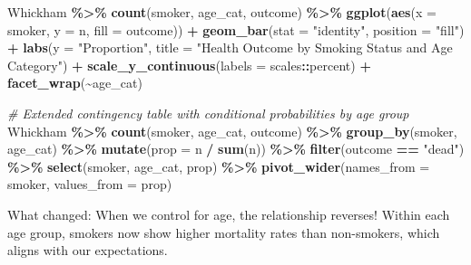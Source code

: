 \documentclass[
]{article}
\newenvironment{Shaded}{\begin{snugshade}}{\end{snugshade}}
\newcommand{\AttributeTok}[1]{\textcolor[rgb]{0.13,0.29,0.53}{#1}}
\newcommand{\CommentTok}[1]{\textcolor[rgb]{0.56,0.35,0.01}{\textit{#1}}}
\newcommand{\FunctionTok}[1]{\textcolor[rgb]{0.13,0.29,0.53}{\textbf{#1}}}
\newcommand{\NormalTok}[1]{#1}
\newcommand{\SpecialCharTok}[1]{\textcolor[rgb]{0.81,0.36,0.00}{\textbf{#1}}}
\newcommand{\StringTok}[1]{\textcolor[rgb]{0.31,0.60,0.02}{#1}}
\begin{document}
\begin{Shaded}
\begin{Highlighting}[]
\NormalTok{Whickham }\SpecialCharTok{\%\textgreater{}\%}
  \FunctionTok{count}\NormalTok{(smoker, age\_cat, outcome) }\SpecialCharTok{\%\textgreater{}\%}
  \FunctionTok{ggplot}\NormalTok{(}\FunctionTok{aes}\NormalTok{(}\AttributeTok{x =}\NormalTok{ smoker, }\AttributeTok{y =}\NormalTok{ n, }\AttributeTok{fill =}\NormalTok{ outcome)) }\SpecialCharTok{+}
  \FunctionTok{geom\_bar}\NormalTok{(}\AttributeTok{stat =} \StringTok{"identity"}\NormalTok{, }\AttributeTok{position =} \StringTok{"fill"}\NormalTok{) }\SpecialCharTok{+}
  \FunctionTok{labs}\NormalTok{(}\AttributeTok{y =} \StringTok{"Proportion"}\NormalTok{, }\AttributeTok{title =} \StringTok{"Health Outcome by Smoking Status and Age Category"}\NormalTok{) }\SpecialCharTok{+}
  \FunctionTok{scale\_y\_continuous}\NormalTok{(}\AttributeTok{labels =}\NormalTok{ scales}\SpecialCharTok{::}\NormalTok{percent) }\SpecialCharTok{+}
  \FunctionTok{facet\_wrap}\NormalTok{(}\SpecialCharTok{\textasciitilde{}}\NormalTok{age\_cat)}
\end{Highlighting}
\end{Shaded}

\begin{Shaded}
\begin{Highlighting}[]
\CommentTok{\# Extended contingency table with conditional probabilities by age group}
\NormalTok{Whickham }\SpecialCharTok{\%\textgreater{}\%}
  \FunctionTok{count}\NormalTok{(smoker, age\_cat, outcome) }\SpecialCharTok{\%\textgreater{}\%}
  \FunctionTok{group\_by}\NormalTok{(smoker, age\_cat) }\SpecialCharTok{\%\textgreater{}\%}
  \FunctionTok{mutate}\NormalTok{(}\AttributeTok{prop =}\NormalTok{ n }\SpecialCharTok{/} \FunctionTok{sum}\NormalTok{(n)) }\SpecialCharTok{\%\textgreater{}\%}
  \FunctionTok{filter}\NormalTok{(outcome }\SpecialCharTok{==} \StringTok{"dead"}\NormalTok{) }\SpecialCharTok{\%\textgreater{}\%}
  \FunctionTok{select}\NormalTok{(smoker, age\_cat, prop) }\SpecialCharTok{\%\textgreater{}\%}
  \FunctionTok{pivot\_wider}\NormalTok{(}\AttributeTok{names\_from =}\NormalTok{ smoker, }\AttributeTok{values\_from =}\NormalTok{ prop)}
\end{Highlighting}
\end{Shaded}

What changed: When we control for age, the relationship reverses! Within
each age group, smokers now show higher mortality rates than
non-smokers, which aligns with our expectations.
\end{document}
